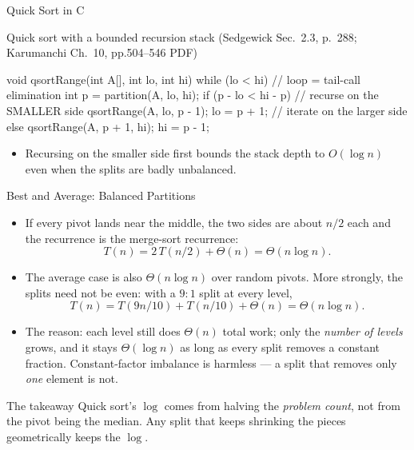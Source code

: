 \documentclass[aspectratio=169]{beamer}
\begin{document}
\begin{frame}[fragile]{Quick Sort in C}
  \footnotesize
  \begin{block}{Quick sort with a bounded recursion stack (Sedgewick
    Sec.~2.3, p.~288; Karumanchi Ch.~10, pp.504--546 PDF)
    \cite{Sedgewick2011_algorithms,Karumanchi2017_data_structures_algorithms_made_easy}}
\begin{semiverbatim}
void qsortRange(int A[], int lo, int hi) {
  while (lo < hi) {                 // loop = tail-call elimination
    int p = partition(A, lo, hi);
    if (p - lo < hi - p) {          // recurse on the SMALLER side
      qsortRange(A, lo, p - 1);
      lo = p + 1;                   // iterate on the larger side
    } else {
      qsortRange(A, p + 1, hi);
      hi = p - 1;
    }
  }
}
\end{semiverbatim}
  \end{block}
  \begin{itemize}
    \item Recursing on the smaller side first bounds the stack depth to
      $O(\log n)$ even when the splits are badly unbalanced.
  \end{itemize}
\end{frame}

\begin{frame}{Best and Average: Balanced Partitions}
  \begin{itemize}
    \item If every pivot lands near the middle, the two sides are about
      $n/2$ each and the recurrence is the merge-sort recurrence:
      \[ T(n) = 2\,T(n/2) + \Theta(n) = \Theta(n\log n). \]
    \item The average case is also $\Theta(n\log n)$ over random pivots.
      More strongly, the splits need not be even: with a $9{:}1$ split at
      every level,
      \[ T(n) = T(9n/10) + T(n/10) + \Theta(n) = \Theta(n\log n). \]
    \item The reason: each level still does $\Theta(n)$ total work; only the
      \emph{number of levels} grows, and it stays $\Theta(\log n)$ as long as
      every split removes a constant fraction. Constant-factor imbalance is
      harmless --- a split that removes only \emph{one} element is not.
  \end{itemize}
  \begin{exampleblock}{The takeaway}
    Quick sort's $\log$ comes from halving the \emph{problem count}, not from
    the pivot being the median. Any split that keeps shrinking the pieces
    geometrically keeps the $\log$.
  \end{exampleblock}
\end{frame}
\end{document}
